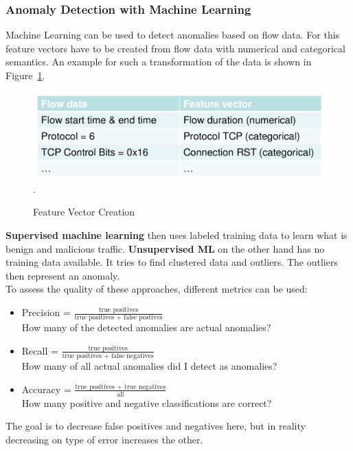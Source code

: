 \subsubsection*{Anomaly Detection with Machine Learning}
Machine Learning can be used to detect anomalies based on flow data.
For this feature vectors have to be created from flow data with numerical and categorical semantics.
An example for such a transformation of the data is shown in Figure~\ref{fig:ml_feature_vector_creation}.
\begin{figure}[h]
  \centering
  \includegraphics[width=.7\textwidth]{figures/ml_feature_vector_creation}.
  \caption{Feature Vector Creation}\label{fig:ml_feature_vector_creation}
\end{figure}

\textbf{Supervised machine learning} then uses labeled training data to learn what is benign and malicious traffic.
\textbf{Unsupervised ML} on the other hand has no training data available.
It tries to find clustered data and outliers.
The outliers then represent an anomaly.\\

To assess the quality of these approaches, different metrics can be used:
\begin{itemize}
  \item Precision = $\frac{\text{true positives}}{\text{true positives + false postives}}$\\
    How many of the detected anomalies are actual anomalies?
  \item Recall = $\frac{\text{true positives}}{\text{true positives + false negatives}}$\\
    How many of all actual anomalies did I detect as anomalies?
  \item Accuracy = $\frac{\text{true positives + true negatives}}{\text{all}}$\\
    How many positive and negative classifications are correct?
\end{itemize}
The goal is to decrease false positives and negatives here, but in reality decreasing on type of error increases the other.

